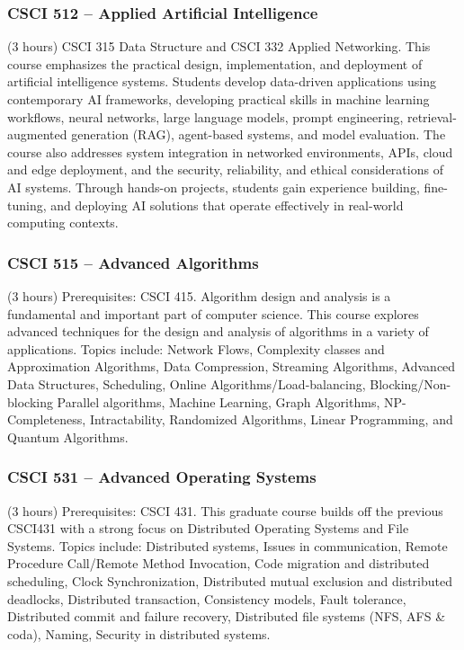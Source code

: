 \subsubsection{CSCI 512 -- Applied Artificial Intelligence}%
\label{course:CSCI:512}
(3 hours) CSCI 315 Data Structure and CSCI 332 Applied Networking. This course emphasizes the practical design, implementation, and deployment of artificial intelligence systems. Students develop data-driven applications using contemporary AI frameworks, developing practical skills in machine learning workflows, neural networks, large language models, prompt engineering, retrieval-augmented generation (RAG), agent-based systems, and model evaluation. The course also addresses system integration in networked environments, APIs, cloud and edge deployment, and the security, reliability, and ethical considerations of AI systems. Through hands-on projects, students gain experience building, fine-tuning, and deploying AI solutions that operate effectively in real-world computing contexts.

\subsubsection{CSCI 515 -- Advanced Algorithms}%
\label{course:CSCI:515}
(3 hours) Prerequisites: CSCI 415. Algorithm design and analysis is a fundamental and important part of computer science.   This course explores advanced techniques for the design and analysis of algorithms in a variety of applications.  Topics include: Network Flows, Complexity classes and Approximation Algorithms, Data Compression, Streaming Algorithms, Advanced Data Structures, Scheduling, Online Algorithms/Load-balancing, Blocking/Non-blocking Parallel algorithms, Machine Learning, Graph Algorithms, NP-Completeness, Intractability, Randomized Algorithms, Linear Programming, and Quantum Algorithms.

\subsubsection{CSCI 531 -- Advanced Operating Systems}%
\label{course:CSCI:531}
(3 hours) Prerequisites: CSCI 431. This graduate course builds off the previous CSCI431 with a strong focus on Distributed Operating Systems and File Systems.  Topics include:  Distributed systems, Issues in communication, Remote Procedure Call/Remote Method Invocation, Code migration and distributed scheduling, Clock Synchronization, Distributed mutual exclusion and distributed deadlocks, Distributed transaction, Consistency models, Fault tolerance, Distributed commit and failure recovery, Distributed file systems (NFS, AFS \& coda), Naming, Security in distributed systems.

